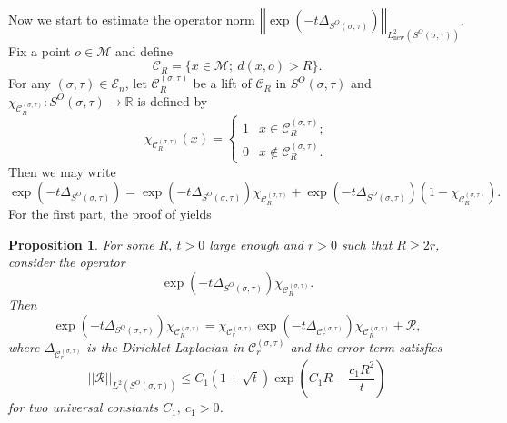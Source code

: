 \documentclass{amsart}
\theoremstyle{plain}
\newtheorem{proposition}[theorem]{Proposition}
\theoremstyle{definition}
\theoremstyle{remark}
\begin{document}
Now we start to estimate the operator norm $\left|\left|\exp\left(-t\Delta_{S^O(\sigma,\tau)}\right)\right|\right|_{L^2_{\text{new}}(S^O(\sigma,\tau))}$. Fix a point $o\in\mathcal{M}$ and define
$$\mathcal{C}_R=\{x\in \mathcal{M};\ d(x,o)>R\}.$$
For any $(\sigma,\tau)\in\mathcal{E}_n$, let $\mathcal{C}_R^{(\sigma,\tau)}$ be a lift of $\mathcal{C}_R$ in $S^O(\sigma,\tau)$ and $\chi_{\mathcal{C}_R^{(\sigma,\tau)}}:S^O(\sigma,\tau)\to\mathbb{R}$ is defined by
$$\chi_{\mathcal{C}_R^{(\sigma,\tau)}}(x)=\begin{cases}
    1 & x\in \mathcal{C}_R^{(\sigma,\tau)};\\ 0 & x\notin \mathcal{C}_R^{(\sigma,\tau)}.
\end{cases}$$
Then we may write 
$$\exp\left(-t\Delta_{S^O(\sigma,\tau)}\right)=\exp\left(-t\Delta_{S^O(\sigma,\tau)}\right)\chi_{\mathcal{C}_R^{(\sigma,\tau)}}+\exp\left(-t\Delta_{S^O(\sigma,\tau)}\right)\left(1-\chi_{\mathcal{C}_R^{(\sigma,\tau)}}\right).$$
For the first part, the proof of \cite[Proposition 3.6]{Moy25} yields
\begin{proposition}\label{p-moy}
    For some $R,\ t>0$ large enough and $r>0$ such that $R\geq 2r$, consider the operator
    $$\exp\left(-t\Delta_{S^O(\sigma,\tau)}\right)\chi_{\mathcal{C}_R^{(\sigma,\tau)}}.$$
    Then 
    $$\exp\left(-t\Delta_{S^O(\sigma,\tau)}\right)\chi_{\mathcal{C}_R^{(\sigma,\tau)}}=\chi_{\mathcal{C}_r^{(\sigma,\tau)}}\exp\left(-t\Delta_{\mathcal{C}_r^{(\sigma,\tau)}}\right)\chi_{\mathcal{C}_R^{(\sigma,\tau)}}+\mathcal{R},$$
    where $\Delta_{\mathcal{C}_r^{(\sigma,\tau)}}$ is the Dirichlet Laplacian in $\mathcal{C}_r^{(\sigma,\tau)}$ and the error term satisfies 
    $$||\mathcal{R}||_{L^2(S^O(\sigma,\tau))}\leq C_1(1+\sqrt{t})\exp\left(C_1R-\frac{c_1R^2}{t}\right)$$
    for two universal constants $C_1,\ c_1>0$.
\end{proposition}
\end{document}
